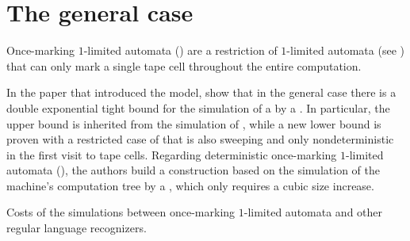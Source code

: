 \section{The general case}\label{sec:oncemarking-general}
Once-marking $1$-limited automata (\OMOLA) are a restriction of $1$-limited automata (see ) that can only mark a single tape cell throughout the entire computation.

In the paper that introduced the model, \citeauthor{PigPri23a} show that in the general case there is a double exponential tight bound for the simulation of a \OMOLA by a \ODFA \cite{PigPri23a}.
In particular, the upper bound is inherited from the simulation of \OLA, while a new lower bound is proven with a restricted case of \OMOLA that is also sweeping and only nondeterministic in the first visit to tape cells.
Regarding deterministic once-marking $1$-limited automata (\OMODLA), the authors build a construction based on the simulation of the machine's computation tree by a \TDFA, which only requires a cubic size increase.

\begin{table}
	\centering
	\caption{Costs of the simulations between once-marking $1$-limited automata and other regular language recognizers.}
	\label{tab:sims-om-general-oncemarking}
\end{table}


